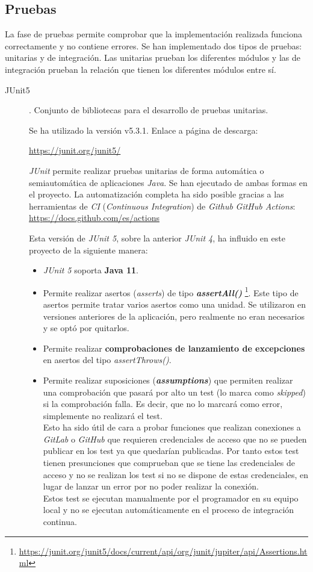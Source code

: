 \subsection{Pruebas}
La fase de pruebas permite comprobar que la implementación realizada funciona correctamente y no contiene errores. Se han implementado dos tipos de pruebas: unitarias y de integración. Las unitarias prueban los diferentes módulos y las de integración prueban la relación que tienen los diferentes módulos entre sí.
\begin{description}
	\item[JUnit5]. Conjunto de bibliotecas para el desarrollo de pruebas unitarias. 
	
		Se ha utilizado la versión  v5.3.1. Enlace a página de descarga:
		
		\url{https://junit.org/junit5/}
		
		\textit{JUnit} permite realizar pruebas unitarias de forma automática o semiautomática de aplicaciones \textit{Java}. Se han ejecutado de ambas formas en el proyecto. La automatización completa ha sido posible gracias a las herramientas de \textit{CI} (\textit{Continuous Integration}) de \textit{Github} \textit{GitHub Actions}: 
		\url{https://docs.github.com/es/actions}
		
		Esta versión de \textit{JUnit 5}, sobre la anterior \textit{JUnit 4}, ha influido en este proyecto de la siguiente manera:
		\begin{itemize}
			\item \textit{JUnit 5} soporta \textbf{Java 11}.
			
			\item Permite realizar asertos (\textit{asserts}) de tipo \textit{\textbf{assertAll()}} \footnote{\url{https://junit.org/junit5/docs/current/api/org/junit/jupiter/api/Assertions.html}}. Este tipo de asertos permite tratar varios asertos como una unidad. Se utilizaron en versiones anteriores de la aplicación, pero realmente no eran necesarios y se optó por quitarlos.
			
			\item Permite realizar \textbf{comprobaciones de lanzamiento de excepciones} en asertos del tipo \textit{assertThrows()}.
			
			\item Permite realizar suposiciones (\textit{\textbf{assumptions}}) que permiten realizar una comprobación que pasará por alto un test (lo marca como \textit{skipped}) si la comprobación falla. Es decir, que no lo marcará como error, simplemente no realizará el test. 
			\\Esto ha sido útil de cara a probar funciones que realizan conexiones a \textit{GitLab} o \textit{GitHub} que requieren credenciales de acceso que no se pueden publicar en los test ya que quedarían publicadas. Por tanto estos test tienen presunciones que comprueban que se tiene las credenciales de acceso y no se realizan los test si no se dispone de estas credenciales, en lugar de lanzar un error por no poder realizar la conexión.
			\\Estos test se ejecutan manualmente por el programador en su equipo local y no se ejecutan automáticamente en el proceso de integración continua.
			

\end{itemize}
\end{description}

